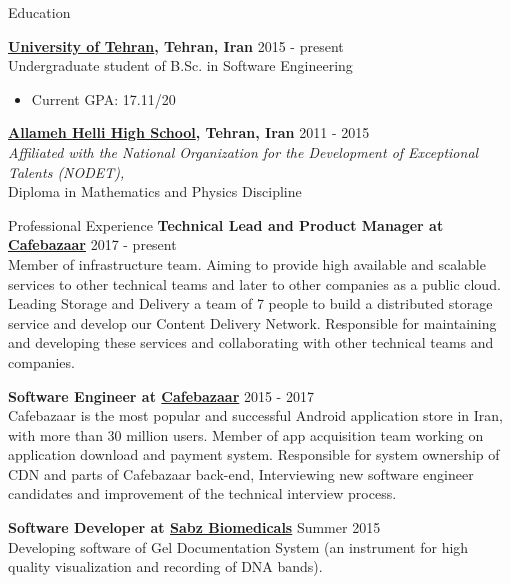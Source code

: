 \documentclass{resume} %
\begin{document}

\begin{rSection}{Education}
	
	{\bf \href{http://ut.ac.ir/en}{University of Tehran}, Tehran, Iran} \hfill 2015 - present
	\\Undergraduate student of B.Sc. in Software Engineering
	
	\begin{itemize}
		\item Current GPA: 17.11/20
	\end{itemize}
	
	{\bf \href{http://www.helli.ir/}{Allameh Helli High School}, Tehran, Iran} \hfill 2011 - 2015
	\\\textit{\scriptsize Affiliated with the National Organization for the Development of Exceptional Talents (NODET),}
	\\Diploma in Mathematics and Physics Discipline
	
\end{rSection}

\begin{rSection}{Professional Experience}
	{\bf Technical Lead and Product Manager at \href{https://cafebazaar.ir/}{Cafebazaar}} \hfill 2017 - present
	\\ Member of infrastructure team. Aiming to provide high available and scalable services to other technical teams and later to other companies as a public cloud. Leading Storage and Delivery a team of 7 people to build a distributed storage service and develop our Content Delivery Network. Responsible for maintaining and developing these services and collaborating with other technical teams and companies.

	{\bf Software Engineer at \href{https://cafebazaar.ir/}{Cafebazaar}} \hfill 2015 - 2017
	\\ Cafebazaar is the most popular and successful Android application store in Iran, with more than 30 million users. Member of app acquisition team working on application download and payment system. Responsible for system ownership of CDN and parts of Cafebazaar back-end, Interviewing new software engineer candidates and improvement of the technical interview process.

	{\bf Software Developer at \href{http://www.sabzgroup.com/}{Sabz Biomedicals}} \hfill Summer 2015
	\\Developing software of Gel Documentation System (an instrument for  high quality visualization and recording of DNA bands).
\end{rSection}
\end{document}
